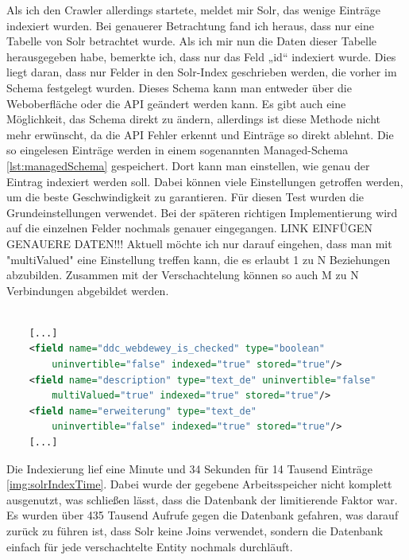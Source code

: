 Als ich den Crawler allerdings startete, meldet mir Solr, das wenige Einträge indexiert wurden. Bei genauerer Betrachtung fand ich heraus, dass nur eine Tabelle von Solr betrachtet wurde. Als ich mir nun die Daten dieser Tabelle herausgegeben habe, bemerkte ich, dass nur das Feld „id“ indexiert wurde. Dies liegt daran, dass nur Felder in den Solr-Index geschrieben werden, die vorher im Schema festgelegt wurden. Dieses Schema kann man entweder über die Weboberfläche oder die API geändert werden kann. Es gibt auch eine Möglichkeit, das Schema direkt zu ändern, allerdings ist diese Methode nicht mehr erwünscht, da die API Fehler erkennt und Einträge so direkt ablehnt. Die so eingelesen Einträge werden in einem sogenannten Managed-Schema \ref{lst:managedSchema} gespeichert. Dort kann man einstellen, wie genau der Eintrag indexiert werden soll. Dabei können viele Einstellungen getroffen werden, um die beste Geschwindigkeit zu garantieren. Für diesen Test wurden die Grundeinstellungen verwendet. Bei der späteren richtigen Implementierung wird auf die einzelnen Felder nochmals genauer eingegangen. {LINK EINFÜGEN GENAUERE DATEN!!!} Aktuell möchte ich nur darauf eingehen, dass man mit "multiValued" eine Einstellung treffen kann, die es erlaubt 1 zu N Beziehungen abzubilden. Zusammen mit der Verschachtelung können so auch M zu N Verbindungen abgebildet werden. 

\begin{lstlisting}[language=xml, frame=single, label={lst:managedSchema}, 
    morekeywords={type,uninvertible,indexed,stored,field,multiValued, name}] 

    [...]
    <field name="ddc_webdewey_is_checked" type="boolean" 
        uninvertible="false" indexed="true" stored="true"/>
    <field name="description" type="text_de" uninvertible="false" 
        multiValued="true" indexed="true" stored="true"/>
    <field name="erweiterung" type="text_de" 
        uninvertible="false" indexed="true" stored="true"/>
    [...]

\end{lstlisting}

Die Indexierung lief eine Minute und 34 Sekunden für 14 Tausend Einträge \ref{img:solrIndexTime}. Dabei wurde der gegebene Arbeitsspeicher nicht komplett ausgenutzt, was schließen lässt, dass die Datenbank der limitierende Faktor war. Es wurden über 435 Tausend Aufrufe gegen die Datenbank gefahren, was darauf zurück zu führen ist, dass Solr keine Joins verwendet, sondern die Datenbank einfach für jede verschachtelte Entity nochmals durchläuft.

